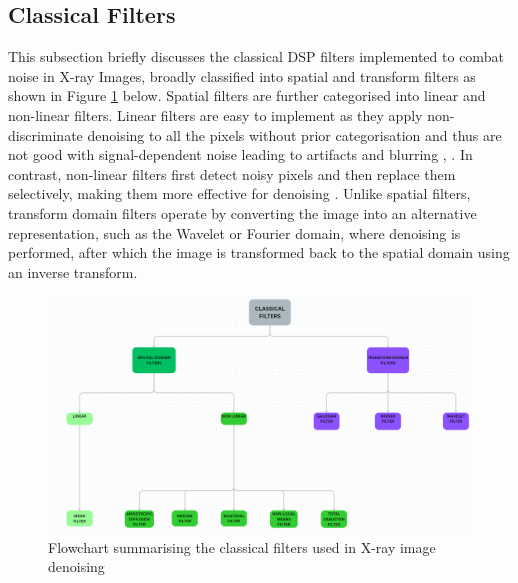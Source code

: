 \subsection{Classical Filters}
This subsection briefly discusses the classical \gls{DSP} filters implemented to combat noise in X-ray Images, broadly classified into spatial and transform filters as shown in Figure \ref{fig:classicflo} below.  Spatial filters are further categorised into linear and non-linear filters. Linear filters are easy to implement as they apply non-discriminate denoising to all the pixels without prior categorisation \cite{khan_new_2016} and thus are not good with signal-dependent noise leading to artifacts and blurring \cite{juneja_denoising_2024}, \cite{mandic_denoising_2018}. In contrast, non-linear filters first detect noisy pixels and then replace them selectively, making them more effective for denoising \cite{khan_new_2016}. Unlike spatial filters, transform domain filters operate by converting the image into an alternative representation, such as the Wavelet or Fourier domain, where denoising is performed, after which the image is transformed back to the spatial domain using an inverse transform.

\begin{figure}[h!]
	\centering
	\includegraphics[width=0.9\linewidth]{3_Chapters//2_Chapter_LiteratureReview//Figures/ClassicalFlowchart.png}
	\caption{Flowchart summarising the classical filters used in X-ray image denoising}
	\label{fig:classicflo}
\end{figure}


